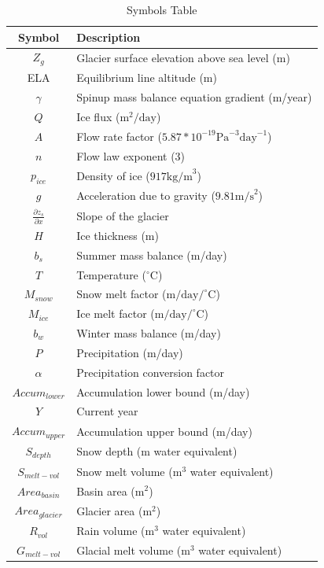 \documentclass{article}
\begin{document}
\begin{table}[h!]
    \centering
    \begin{tabularx}{\textwidth}{|c|X|}
        \hline
        Symbol & Description \\
        \hline
        $Z_g$ & Glacier surface elevation above sea level (m) \\
        ELA & Equilibrium line altitude (m)\\
        $\gamma$ & Spinup mass balance equation gradient (m/year)\\
        $Q$ & Ice flux ($\text{m}^2/\text{day}$)\\
        $A$ & Flow rate factor ($5.87*10^{-19}\text{Pa}^{-3}\text{day}^{-1}$) \\
        $n$ & Flow law exponent (3) \\
        $p_{ice}$ & Density of ice ($917\text{kg/m}^3$) \\
        $g$ & Acceleration due to gravity ($9.81\text{m/s}^2$) \\
        $\frac{\partial z_s}{\partial x}$ & Slope of the glacier \\
        $H$ & Ice thickness (m)\\
        $b_s$ & Summer mass balance (m/day) \\
        $T$ & Temperature ($^\circ$C) \\$M_{snow}$ & Snow melt factor ($\text{m}/\text{day}/^\circ\text{C}$) \\
        $M_{ice}$ & Ice melt factor ($\text{m}/\text{day}/^\circ\text{C}$) \\
        $b_w$ & Winter mass balance (m/day) \\
        $P$ & Precipitation (m/day) \\
        $\alpha$ & Precipitation conversion factor \\
        ${Accum}_{lower}$ & Accumulation lower bound (m/day) \\
        $Y$ & Current year \\
        ${Accum}_{upper}$ & Accumulation upper bound (m/day) \\
        $S_{depth}$ & Snow depth (m water equivalent) \\
        $S_{melt-vol}$ & Snow melt volume ($\text{m}^3$ water equivalent) \\
        ${Area}_{basin}$ & Basin area ($\text{m}^2$) \\
        ${Area}_{glacier} $ & Glacier area ($\text{m}^2$) \\
        $R_{vol}$ & Rain volume ($\text{m}^3$ water equivalent) \\
        $G_{melt-vol}$ & Glacial melt volume ($\text{m}^3$ water equivalent) \\
        \hline
    \end{tabularx}
    \caption{Symbols Table}
    \label{tab:symbols_table}
\end{table}
\FloatBarrier
\end{document}
